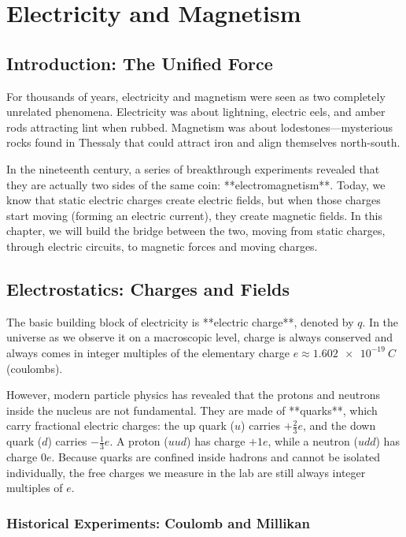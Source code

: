 \chapter{Electricity and Magnetism}

\section{Introduction: The Unified Force}

For thousands of years, electricity and magnetism were seen as two completely unrelated phenomena. Electricity was about lightning, electric eels, and amber rods attracting lint when rubbed. Magnetism was about lodestones—mysterious rocks found in Thessaly that could attract iron and align themselves north-south. 

In the nineteenth century, a series of breakthrough experiments revealed that they are actually two sides of the same coin: **electromagnetism**. Today, we know that static electric charges create electric fields, but when those charges start moving (forming an electric current), they create magnetic fields. In this chapter, we will build the bridge between the two, moving from static charges, through electric circuits, to magnetic forces and moving charges.

\section{Electrostatics: Charges and Fields}

The basic building block of electricity is **electric charge**, denoted by $q$. In the universe as we observe it on a macroscopic level, charge is always conserved and always comes in integer multiples of the elementary charge $e \approx \SI{1.602e-19}{C}$ (coulombs).

However, modern particle physics has revealed that the protons and neutrons inside the nucleus are not fundamental. They are made of **quarks**, which carry fractional electric charges: the up quark ($u$) carries $+\frac{2}{3}e$, and the down quark ($d$) carries $-\frac{1}{3}e$. A proton ($uud$) has charge $+1e$, while a neutron ($udd$) has charge $0e$. Because quarks are confined inside hadrons and cannot be isolated individually, the free charges we measure in the lab are still always integer multiples of $e$.

\subsection{Historical Experiments: Coulomb and Millikan}

